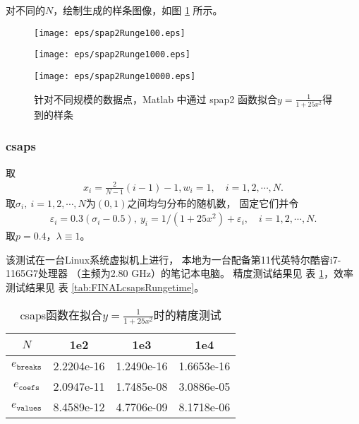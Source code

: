 对不同的$N$，绘制生成的样条图像，如图 \ref{fig:FINALspap2Runge} 所示。

\begin{figure}[h]  
  \centering   
  \begin{minipage}{0.3\textwidth}  
    \centering  
    \texttt{[image: eps/spap2Runge100.eps]}  
    \caption*{$N=100$}  
  \end{minipage}  
  \hfill  
  \begin{minipage}{0.3\textwidth}  
    \centering  
    \texttt{[image: eps/spap2Runge1000.eps]}  
    \caption*{$N=1000$}  
  \end{minipage}
  \hfill  
  \begin{minipage}{0.3\textwidth}  
    \centering  
    \texttt{[image: eps/spap2Runge10000.eps]}  
    \caption*{$N=10000$}  
  \end{minipage}   
  \caption{针对不同规模的数据点，Matlab 中通过 spap2 函数拟合$y=\frac{1}{1+25x^{2}}$得到的样条}
  \label{fig:FINALspap2Runge}  
\end{figure}

\subsubsection{csaps}
\label{subsubsec:csapsRunge}
取
\begin{align*}
    x_{i}=\frac{2}{N-1} (i-1)-1,
  w_{i}=1, \quad i=1,2,\cdots,N.
\end{align*}
取$\sigma_{i},\ i=1,2,\cdots,N$为$(0,1)$之间均匀分布的随机数，
固定它们并令
\begin{align*}
  \varepsilon_{i}=0.3(\sigma_{i}-0.5),\
  y_{i}=1/(1+25x^{2})+\varepsilon_{i},\quad i=1,2,\cdots,N.
\end{align*}
取$p=0.4$，$\lambda\equiv 1$。

该测试在一台Linux系统虚拟机上进行，
本地为一台配备第11代英特尔酷睿i7-1165G7处理器
（主频为2.80 GHz）的笔记本电脑。
精度测试结果见
表 \ref{tab:FINALcsapsRungeacc}，效率测试结果见
表 \ref{tab:FINALcsapsRungetime}。

\begin{table}[htbp]
  \centering
  \caption{\label{tab:FINALcsapsRungeacc}csaps函数在拟合$y=\frac{1}{1+25x^{2}}$时的精度测试}
  \begin{tabular}{cccc}
    \hline
    $N$& 1e2 & 1e3 & 1e4\\
    \hline
    $e_{\texttt{breaks}}$& 2.2204e-16&  1.2490e-16& 1.6653e-16\\
    $e_{\texttt{coefs}}$&2.0947e-11&1.7485e-08&3.0886e-05\\
    $e_{\texttt{values}}$& 8.4589e-12&4.7706e-09&8.1718e-06\\
    \hline
  \end{tabular}
\end{table}

